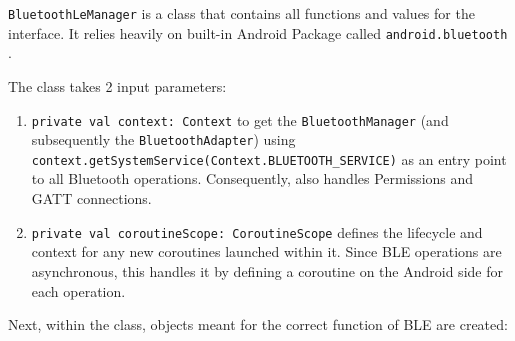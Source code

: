  \texttt{BluetoothLeManager} is a class that contains all functions and values for the interface. It relies heavily on built-in Android Package called \texttt{android.bluetooth} \cite{android_bluetooth}. 

The class takes 2 input parameters:
\begin{enumerate}
	\item \texttt{private val context: Context} to get the \texttt{BluetoothManager} (and subsequently the \texttt{BluetoothAdapter}) using \texttt{context.getSystemService(Context.BLUETOOTH\_SERVICE)} as an entry point to all Bluetooth operations. Consequently, also handles Permissions and \ac{GATT} connections.
	\item \texttt{private val coroutineScope: CoroutineScope} defines the lifecycle and context for any new coroutines launched within it. Since \ac{BLE} operations are asynchronous, this handles it by defining a coroutine on the Android side for each operation.
\end{enumerate} 
Next, within the class, objects meant for the correct function of \ac{BLE} are created:
